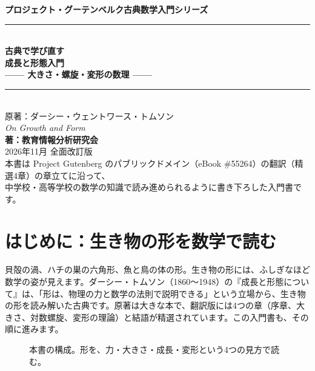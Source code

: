 \documentclass[a4paper,11pt,openany]{ltjsbook}
\begin{document}
\begin{titlepage}
\begin{center}
\vspace*{1.5cm}
{\Large\bfseries プロジェクト・グーテンベルク古典数学入門シリーズ}\\[0.8cm]
\rule{\textwidth}{1.5pt}\\[0.4cm]
{\Huge\bfseries 古典で学び直す\\成長と形態入門}\\[0.4cm]
{\Large\bfseries —— 大きさ・螺旋・変形の数理 ——}\\[0.4cm]
\rule{\textwidth}{1.5pt}\\[1.5cm]
{\large 原著：ダーシー・ウェントワース・トムソン\\
\textit{On Growth and Form}}\\[2.0cm]
{\Large\bfseries 著：教育情報分析研究会}\\[2.5cm]
\vfill
{\large 2026年11月 全面改訂版}\\[0.5cm]
{\footnotesize 本書は Project Gutenberg のパブリックドメイン（eBook \#55264）の翻訳（精選4章）の章立てに沿って、\\
中学校・高等学校の数学の知識で読み進められるように書き下ろした入門書です。}
\end{center}
\end{titlepage}

\frontmatter
\tableofcontents
\mainmatter

\chapter*{はじめに：生き物の形を数学で読む}

貝殻の渦、ハチの巣の六角形、魚と鳥の体の形。生き物の形には、ふしぎなほど数学の姿が見えます。ダーシー・トムソン（1860〜1948）の『成長と形態について』は、「形は、物理の力と数学の法則で説明できる」という立場から、生き物の形を読み解いた古典です。原著は大きな本で、翻訳版には4つの章（序章、大きさ、対数螺旋、変形の理論）と結語が精選されています。この入門書も、その順に進みます。

\begin{figure}[htbp]
\centering
{}
\caption{本書の構成。形を、力・大きさ・成長・変形という4つの見方で読む。}
\end{figure}
\end{document}
